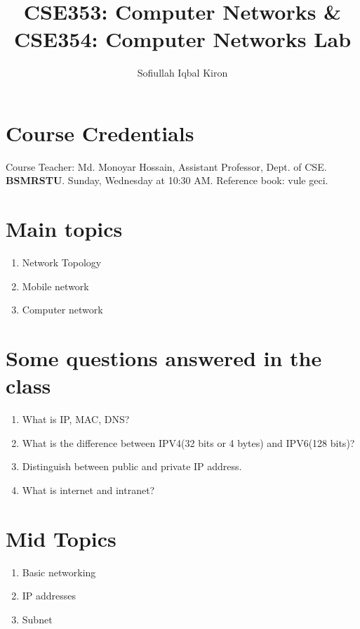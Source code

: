 \documentclass{article}
\author{Sofiullah Iqbal Kiron}
\title{CSE353: Computer Networks \linebreak \& \linebreak CSE354: Computer Networks Lab}
\begin{document}
\maketitle

\section*{Course Credentials}
\begin{flushright}
    Course Teacher: Md. Monoyar Hossain, Assistant Professor, \linebreak Dept. of CSE. \linebreak \textbf{BSMRSTU}.
    \linebreak
    Sunday, Wednesday at 10:30 AM.
    \linebreak
    Reference book: vule geci.
\end{flushright}

\section*{Main topics}
\begin{enumerate}
    \item Network Topology
    \item Mobile network
    \item Computer network
\end{enumerate}

\section*{Some questions answered in the class}

\begin{enumerate}
    \item What is IP, MAC, DNS?
    \item What is the difference between IPV4(32 bits or 4 bytes) and IPV6(128 bits)?
    \item Distinguish between public and private IP address.
    \item What is internet and intranet?
\end{enumerate}

\section*{Mid Topics}
\begin{enumerate}
    \item Basic networking
    \item IP addresses
    \item Subnet
\end{enumerate}
\end{document}
